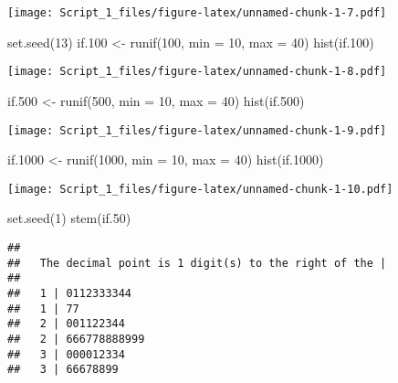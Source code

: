 \documentclass[
]{article}
\newenvironment{Shaded}{\begin{snugshade}}{\end{snugshade}}
\newcommand{\AttributeTok}[1]{\textcolor[rgb]{0.77,0.63,0.00}{#1}}
\newcommand{\DecValTok}[1]{\textcolor[rgb]{0.00,0.00,0.81}{#1}}
\newcommand{\FloatTok}[1]{\textcolor[rgb]{0.00,0.00,0.81}{#1}}
\newcommand{\FunctionTok}[1]{\textcolor[rgb]{0.00,0.00,0.00}{#1}}
\newcommand{\NormalTok}[1]{#1}
\newcommand{\OtherTok}[1]{\textcolor[rgb]{0.56,0.35,0.01}{#1}}
\begin{document}
\texttt{[image: Script\_1\_files/figure-latex/unnamed-chunk-1-7.pdf]}

\begin{Shaded}
\begin{Highlighting}[]
\FunctionTok{set.seed}\NormalTok{(}\DecValTok{13}\NormalTok{)}
\NormalTok{if}\FloatTok{.100} \OtherTok{\textless{}{-}} \FunctionTok{runif}\NormalTok{(}\DecValTok{100}\NormalTok{, }\AttributeTok{min =} \DecValTok{10}\NormalTok{, }\AttributeTok{max =} \DecValTok{40}\NormalTok{)}
\FunctionTok{hist}\NormalTok{(if}\FloatTok{.100}\NormalTok{)}
\end{Highlighting}
\end{Shaded}

\texttt{[image: Script\_1\_files/figure-latex/unnamed-chunk-1-8.pdf]}

\begin{Shaded}
\begin{Highlighting}[]
\NormalTok{if}\FloatTok{.500} \OtherTok{\textless{}{-}} \FunctionTok{runif}\NormalTok{(}\DecValTok{500}\NormalTok{, }\AttributeTok{min =} \DecValTok{10}\NormalTok{, }\AttributeTok{max =} \DecValTok{40}\NormalTok{)}
\FunctionTok{hist}\NormalTok{(if}\FloatTok{.500}\NormalTok{)}
\end{Highlighting}
\end{Shaded}

\texttt{[image: Script\_1\_files/figure-latex/unnamed-chunk-1-9.pdf]}

\begin{Shaded}
\begin{Highlighting}[]
\NormalTok{if}\FloatTok{.1000} \OtherTok{\textless{}{-}} \FunctionTok{runif}\NormalTok{(}\DecValTok{1000}\NormalTok{, }\AttributeTok{min =} \DecValTok{10}\NormalTok{, }\AttributeTok{max =} \DecValTok{40}\NormalTok{)}
\FunctionTok{hist}\NormalTok{(if}\FloatTok{.1000}\NormalTok{)}
\end{Highlighting}
\end{Shaded}

\texttt{[image: Script\_1\_files/figure-latex/unnamed-chunk-1-10.pdf]}

\begin{Shaded}
\begin{Highlighting}[]
\FunctionTok{set.seed}\NormalTok{(}\DecValTok{1}\NormalTok{)}
\FunctionTok{stem}\NormalTok{(if}\FloatTok{.50}\NormalTok{)}
\end{Highlighting}
\end{Shaded}

\begin{verbatim}
## 
##   The decimal point is 1 digit(s) to the right of the |
## 
##   1 | 0112333344
##   1 | 77
##   2 | 001122344
##   2 | 666778888999
##   3 | 000012334
##   3 | 66678899
\end{verbatim}
\end{document}
